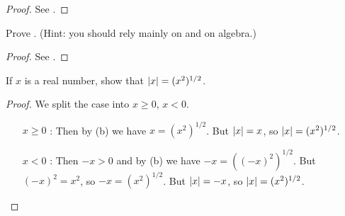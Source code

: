 \begin{proof}
See .
\end{proof}

\begin{exercise} \label{exercise 5.6.2}
Prove .
(Hint: you should rely mainly on  and on algebra.)
\end{exercise}

\begin{proof}
See .
\end{proof}

\begin{exercise} \label{exercise 5.6.3}
If \(x\) is a real number, show that \(\lvert x\rvert = (x^2)^{1/2}\).
\end{exercise}

\begin{proof}
We split the case into \(x \ge 0\), \(x < 0\).
\begin{itemize}
    \item [\(x \ge 0\)]:
        Then by (b) we have \(x = (x^2)^{1/2}\).
        But \(\lvert x\rvert = x\), so \(\lvert x\rvert = (x^2)^{1/2}\).
    \item [\(x < 0\)]:
        Then \(-x > 0\) and by (b) we have \(-x = ((-x)^2)^{1/2}\).
        But \((-x)^2 = x^2\), so \(-x = (x^2)^{1/2}\).
        But \(\lvert x\rvert = -x\), so \(\lvert x\rvert = (x^2)^{1/2}\).
\end{itemize}
\end{proof}